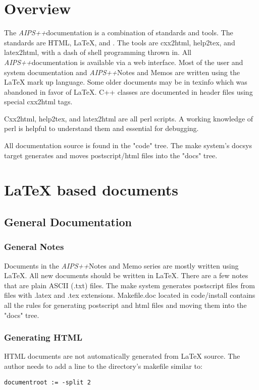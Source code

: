 \newcommand{\aips}{\textit{AIPS++}}
\section{Overview}
The \aips documentation is a combination of standards and tools.
The standards are HTML, LaTeX, and \htmladdnormallink{\aips guidelines}{}. 
The tools are cxx2html, help2tex, and
latex2html, with a dash of shell programming thrown in.
All \aips documentation is available via a web interface.  
Most of the user and system
documentation and \aips Notes and Memos are written using the LaTeX
mark up language. Some older documents may be in texinfo which was abandoned
in favor of LaTeX. C++ classes are documented in header files using 
special cxx2html tags.

Cxx2html, help2tex, and latex2html are all perl scripts. 
A working knowledge of perl is helpful to understand them and essential for 
debugging.

All documentation source is found in the "code" tree.  The make system's docsys
target generates and moves postscript/html files into the "docs" tree.

\section{LaTeX based documents}
\subsection{General Documentation}
\subsubsection{General Notes}
Documents in the \aips Notes and Memo series are mostly written using LaTeX.
All new documents should be written in LaTeX.
There are a few notes that are plain ASCII (.txt) files.  The make system
generates postscript
files from files with .latex and .tex extensions.  Makefile.doc located in
code/install contains all the rules for generating postscript and html files
and moving them into the "docs" tree.

\subsubsection{Generating HTML}
HTML documents are not automatically generated from LaTeX source.  The author
needs to add a line to the directory's makefile similar to:
\begin{verbatim}
documentroot := -split 2
\end{verbatim}

